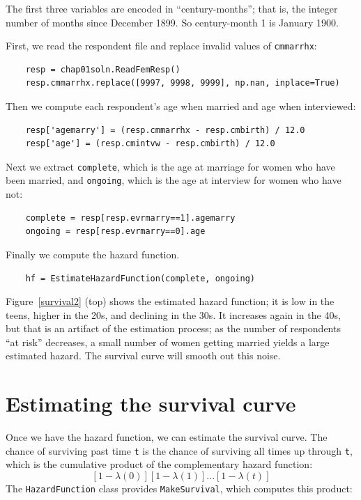 \documentclass[12pt]{book}
\theoremstyle{exercise}
\begin{document}
The first three variables are encoded in ``century-months''; that is, the
integer number of months since December 1899.  So century-month
1 is January 1900.%

First, we read the respondent file and replace invalid values of
{\tt cmmarrhx}:

\begin{verbatim}
    resp = chap01soln.ReadFemResp()
    resp.cmmarrhx.replace([9997, 9998, 9999], np.nan, inplace=True)
\end{verbatim}

Then we compute each respondent's age when married and age when
interviewed:%

\begin{verbatim}
    resp['agemarry'] = (resp.cmmarrhx - resp.cmbirth) / 12.0
    resp['age'] = (resp.cmintvw - resp.cmbirth) / 12.0
\end{verbatim}

Next we extract {\tt complete}, which is the age at marriage for
women who have been married, and {\tt ongoing}, which is the
age at interview for women who have not:%

\begin{verbatim}
    complete = resp[resp.evrmarry==1].agemarry
    ongoing = resp[resp.evrmarry==0].age
\end{verbatim}

Finally we compute the
hazard function.%

\begin{verbatim}
    hf = EstimateHazardFunction(complete, ongoing)
\end{verbatim}

Figure~\ref{survival2} (top) shows the estimated hazard function;
it is low in the teens,
higher in the 20s, and declining in the 30s.  It increases again in
the 40s, but that is an artifact of the estimation process; as the
number of respondents ``at risk'' decreases, a small number of
women getting married yields a large estimated hazard.  The survival
curve will smooth out this noise.%


\section{Estimating the survival curve}

Once we have the hazard function, we can estimate the survival curve.
The chance of surviving past time {\tt t} is the chance of surviving
all times up through {\tt t}, which is the cumulative product of
the complementary hazard function:
%
\[ [1-\lambda(0)] [1-\lambda(1)] ... [1-\lambda(t)] \]
%
The {\tt HazardFunction} class provides {\tt MakeSurvival}, which
computes this product:%
%
\end{document}
